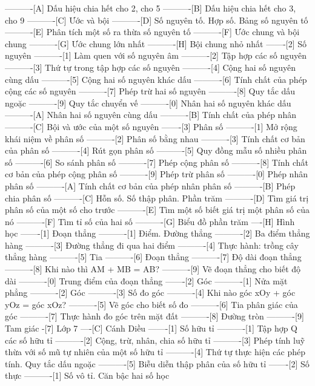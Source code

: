 ----------[A] Dấu hiệu chia hết cho 2, cho 5
----------[B] Dấu hiệu chia hết cho 3, cho 9
----------[C] Ước và bội
----------[D] Số nguyên tố. Hợp số. Bảng số nguyên tố
----------[E] Phân tích một số ra thừa số nguyên tố
----------[F] Ước chung và bội chung
----------[G] Ước chung lớn nhất
----------[H] Bội chung nhỏ nhất
-------[2] Số nguyên
----------[1] Làm quen với số nguyên âm
----------[2] Tập hợp các số nguyên
----------[3] Thứ tự trong tập hợp các số nguyên
----------[4] Cộng hai số nguyên cùng dấu
----------[5] Cộng hai số nguyên khác dấu
----------[6] Tính chất của phép cộng các số nguyên
----------[7] Phép trừ hai số nguyên
----------[8] Quy tắc dấu ngoặc
----------[9] Quy tắc chuyển vế
----------[0] Nhân hai số nguyên khác dấu
----------[A] Nhân hai số nguyên cùng dấu
----------[B] Tính chất của phép nhân
----------[C] Bội và ước của một số nguyên
-------[3] Phân số
----------[1] Mở rộng khái niệm về phân số
----------[2] Phân số bằng nhau
----------[3] Tính chất cơ bản của phân số
----------[4] Rút gọn phân số
----------[5] Quy đồng mẫu số nhiều phân số
----------[6] So sánh phân số
----------[7] Phép cộng phân số
----------[8] Tính chất cơ bản của phép cộng phân số
----------[9] Phép trừ phân số
----------[0] Phép nhân phân số
----------[A] Tính chất cơ bản của phép nhân phân số
----------[B] Phép chia phân số
----------[C] Hỗn số. Số thập phân. Phần trăm
----------[D] Tìm giá trị phân số của một số cho trước
----------[E] Tìm một số biết giá trị một phân số của nó
----------[F] Tìm tỉ số của hai số
----------[G] Biểu đồ phần trăm
----[H] Hình học
-------[1] Đoạn thẳng
----------[1] Điểm. Đường thẳng
----------[2] Ba điểm thẳng hàng
----------[3] Đường thẳng đi qua hai điểm
----------[4] Thực hành: trồng cây thẳng hàng
----------[5] Tia
----------[6] Đoạn thẳng
----------[7] Độ dài đoạn thẳng
----------[8] Khi nào thì AM + MB = AB?
----------[9] Vẽ đoạn thẳng cho biết độ dài
----------[0] Trung điểm của đoạn thẳng
-------[2] Góc
----------[1] Nửa mặt phẳng
----------[2] Góc
----------[3] Số đo góc
----------[4] Khi nào góc xOy + góc yOz = góc xOz?
----------[5] Vẽ góc cho biết số đo
----------[6] Tia phân giác của góc
----------[7] Thực hành đo góc trên mặt đất
----------[8] Đường tròn
----------[9] Tam giác
-[7] Lớp 7
----[C] Cánh Diều
-------[1] Số hữu tỉ
----------[1] Tập hợp Q các số hữu tỉ
----------[2] Cộng, trừ, nhân, chia số hữu tỉ
----------[3] Phép tính luỹ thừa với số mũ tự nhiên của một số hữu tỉ
----------[4] Thứ tự thực hiện các phép tính. Quy tắc dấu ngoặc
----------[5] Biễu diễn thập phân của số hữu tỉ
-------[2] Số thực
----------[1] Số vô tỉ. Căn bậc hai số học
